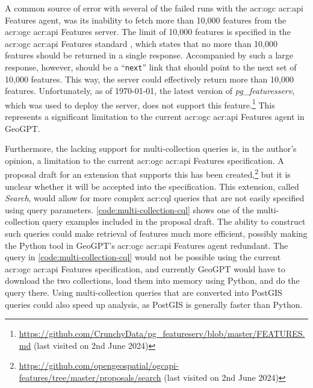 A common source of error with several of the failed runs with the \acrshort{acr:ogc} \acrshort{acr:api} Features agent, was its inability to fetch more than 10,000 features from the \acrshort{acr:ogc} \acrshort{acr:api} Features server. The limit of 10,000 features is specified in the \acrshort{acr:ogc} \acrshort{acr:api} Features standard \citep{opengeospatialconsortiumOGCAPIFeatures2022}, which states that no more than 10,000 features should be returned in a single response. Accompanied by such a large response, however, should be a \enquote{\texttt{next}} link that should point to the next set of 10,000 features. This way, the server could effectively return more than 10,000 features. Unfortunately, as of \today, the latest version of \textit{pg\_featuresserv}, which was used to deploy the server, does not support this feature.\footnote{\url{https://github.com/CrunchyData/pg_featureserv/blob/master/FEATURES.md} (last visited on 2nd June 2024)} This represents a significant limitation to the current \acrshort{acr:ogc} \acrshort{acr:api} Features agent in GeoGPT.

Furthermore, the lacking support for multi-collection queries is, in the author's opinion, a limitation to the current \acrshort{acr:ogc} \acrshort{acr:api} Features specification. A proposal draft for an extension that supports this has been created,\footnote{\url{https://github.com/opengeospatial/ogcapi-features/tree/master/proposals/search} (last visited on 2nd June 2024)} but it is unclear whether it will be accepted into the specification. This extension, called \textit{Search}, would allow for more complex \acrshort{acr:cql} queries that are not easily specified using query parameters. \autoref{code:multi-collection-cql} shows one of the multi-collection query examples included in the proposal draft. The ability to construct such queries could make retrieval of features much more efficient, possibly making the Python tool in GeoGPT's \acrshort{acr:ogc} \acrshort{acr:api} Features agent redundant. The query in \autoref{code:multi-collection-cql} would not be possible using the current \acrshort{acr:ogc} \acrshort{acr:api} Features specification, and currently GeoGPT would have to download the two collections, load them into memory using Python, and do the query there. Using multi-collection queries that are converted into PostGIS queries could also speed up analysis, as PostGIS is generally faster than Python.


